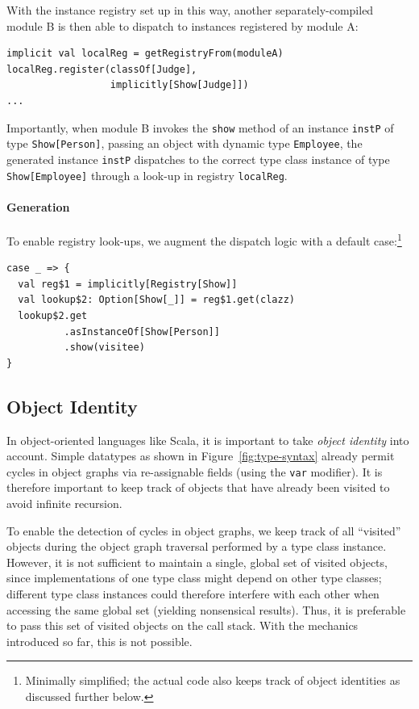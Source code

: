 \documentclass[preprint]{sigplanconf}
\begin{document}
With the instance registry set up in this way, another separately-compiled
module B is then able to dispatch to instances registered by module A:

\begin{lstlisting}
implicit val localReg = getRegistryFrom(moduleA)
localReg.register(classOf[Judge],
                  implicitly[Show[Judge]])
...
\end{lstlisting}
\noindent
Importantly, when module B invokes the \verb|show| method of an instance
\verb|instP| of type \verb|Show[Person]|, passing an object with dynamic type
\verb|Employee|, the generated instance \verb|instP| dispatches to the correct
type class instance of type \verb|Show[Employee]| through a look-up in
registry \verb|localReg|.

\paragraph{Generation}

To enable registry look-ups, we augment the dispatch logic with a default
case:\footnote{Minimally simplified; the actual code also keeps track of object
identities as discussed further below.}
\begin{lstlisting}
case _ => {
  val reg$1 = implicitly[Registry[Show]]
  val lookup$2: Option[Show[_]] = reg$1.get(clazz)
  lookup$2.get
          .asInstanceOf[Show[Person]]
          .show(visitee)
}
\end{lstlisting}


\subsection{Object Identity}\label{sec:oo-object-identity}

In object-oriented languages like Scala, it is important to take \emph{object
identity} into account. Simple datatypes as shown in
Figure~\ref{fig:type-syntax} already permit cycles in object graphs via re-assignable
fields (using the \verb|var| modifier). It is therefore important to keep
track of objects that have already been visited to avoid infinite recursion.

To enable the detection of cycles in object graphs, we keep track of all
``visited'' objects during the object graph traversal performed by a type
class instance. However, it is not sufficient to maintain a single, global set
of visited objects, since implementations of one type class might depend on
other type classes; different type class instances could therefore interfere
with each other when accessing the same global set (yielding nonsensical
results). Thus, it is preferable to pass this set of visited objects on the
call stack. With the mechanics introduced so far, this is not possible.
\end{document}
